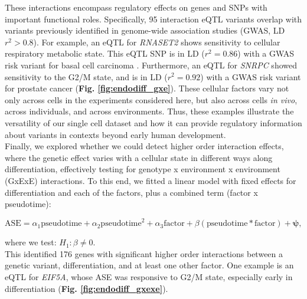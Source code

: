 These interactions encompass regulatory effects on genes and SNPs with important functional roles. Specifically, 95 interaction eQTL variants overlap with variants previously identified in genome-wide association studies (GWAS, LD $r^2>0.8$). 
For example, an eQTL for \textit{RNASET2} shows sensitivity to cellular respiratory metabolic state. 
This eQTL SNP is in LD ($r^2=0.86$) with a GWAS risk variant for basal cell carcinoma \cite{chahal2016genome}. Furthermore, an eQTL for \textit{SNRPC} showed sensitivity to the G2/M state, and is in LD ($r^2=0.92$) with a GWAS risk variant for prostate cancer \cite{schumacher2018association} (\textbf{Fig. \ref{fig:endodiff_gxe}}). 
These cellular factors vary not only across cells in the experiments considered here, but also across cells \textit{in vivo}, across individuals, and across environments. 
Thus, these examples illustrate the versatility of our single cell dataset and how it can provide regulatory information about variants in contexts beyond early human development.\\

Finally, we explored whether we could detect higher order interaction effects, where the genetic effect varies with a cellular state in different ways along differentiation, effectively testing for genotype x environment x environment (GxExE) interactions. 
To this end, we fitted a linear model with fixed effects for differentiation and each of the factors, plus a combined term (factor x pseudotime):

\begin{equation}\label{eq:endodiff_ase_gxexe}
    \mathrm{ASE} = \alpha_1 \mathrm{pseudotime} + \alpha_2 \mathrm{pseudotime}^2 + \alpha_3\mathrm{factor} + \beta (\mathrm{pseudotime}*\mathrm{factor}) + \boldsymbol{\psi},
\end{equation}

where we test: $H_1: \beta \neq 0$. \\

This identified 176 genes with significant higher order interactions between a genetic variant, differentiation, and at least one other factor. 
One example is an eQTL for \textit{EIF5A}, whose ASE was responsive to G2/M state, especially early in differentiation (\textbf{Fig. \ref{fig:endodiff_gxexe}}). 

